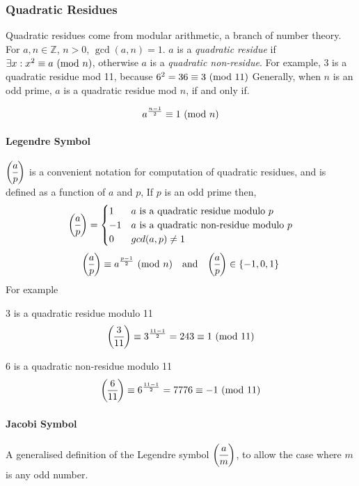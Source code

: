 \subsubsection{Quadratic Residues} \cite{andrews1994number}
Quadratic residues come from modular arithmetic, a branch of number theory.
\bigskip
\newline
For $a, n \in \mathbb{Z}$, $n > 0$, $\gcd(a, n) = 1 $.
$a$ is a \textit{quadratic residue} if  $\exists x:x^2 \equiv a \ (\mathrm{mod}\ n)$, otherwise $a$ is a \textit{quadratic non-residue}.
\bigskip
\newline
For example, $3$ is a quadratic residue mod 11, because $6^2 = 36 \equiv 3 \ (\mathrm{mod}\ 11)$
\bigskip
\newline
Generally, when $n$ is an odd prime, $a$ is a quadratic residue mod $n$, if and only if.

$$a^{\frac{n-1}{2}} \equiv 1 \ (\mathrm{mod}\ n)$$

\paragraph{Legendre Symbol} $\dlegendre{a}{p}$ is a convenient notation for computation of quadratic residues, and is defined as a function of $a$ and $p$,
\bigskip
\newline
If $p$ is an odd prime then,
$$
\dlegendre{a}{p} =
		\begin{cases}
			1 & \text{$a$ is a quadratic residue modulo $p$}\\
			-1 & \text{$a$ is a quadratic non-residue modulo $p$}\\
			0 & \text{$gcd(a, p) \not = 1$}\\
		\end{cases}
$$
\smallskip
$$
\dlegendre{a}{p} \equiv a^{\frac{p - 1}{2}} \Mod{n} \quad \text{and} \quad \dlegendre{a}{p} \in \{-1, 0, 1\}
$$
For example

\begin{description}
	\item 3 is a quadratic residue modulo 11
	$$\dlegendre{3}{11}\equiv 3^{\frac{11-1}{2}} = 243 \equiv 1 \Mod{11}$$
	\item 6 is a quadratic non-residue modulo 11
	$$\dlegendre{6}{11}\equiv 6^{\frac{11-1}{2}} = 7776  \equiv -1 \Mod{11}$$

\end{description}

\paragraph{Jacobi Symbol}
A generalised definition of the Legendre symbol $\dlegendre{a}{m}$, to allow the case where $m$ is any odd number.

